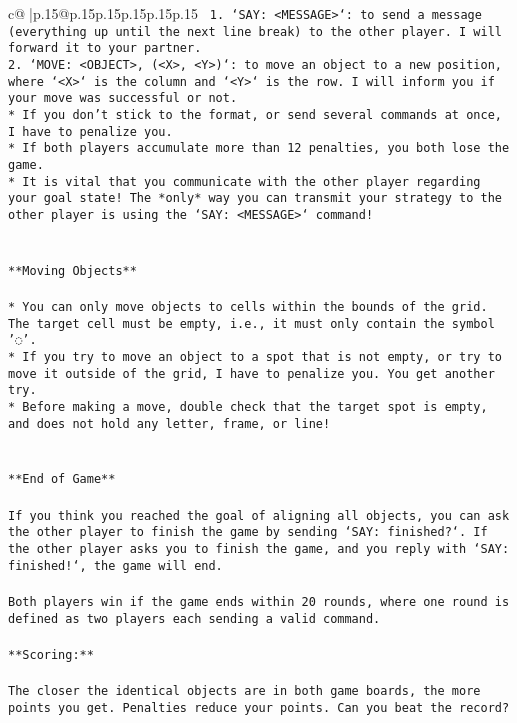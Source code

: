 \documentclass{article}
\begin{document}
{\begin{supertabular}{c@{$\;$}|p{.15\linewidth}@{}p{.15\linewidth}p{.15\linewidth}p{.15\linewidth}p{.15\linewidth}p{.15\linewidth}}
{{{\texttt{ 1. `SAY: <MESSAGE>`: to send a message (everything up until the next line break) to the other player. I will forward it to your partner.} \\
\texttt{2. `MOVE: <OBJECT>, (<X>, <Y>)`: to move an object to a new position, where `<X>` is the column and `<Y>` is the row. I will inform you if your move was successful or not.} \\
\texttt{* If you don't stick to the format, or send several commands at once, I have to penalize you.} \\
\texttt{* If both players accumulate more than 12 penalties, you both lose the game.} \\
\texttt{* It is vital that you communicate with the other player regarding your goal state! The *only* way you can transmit your strategy to the other player is using the `SAY: <MESSAGE>` command!} \\
\\ 
\\ 
\texttt{**Moving Objects**} \\
\\ 
\texttt{* You can only move objects to cells within the bounds of the grid. The target cell must be empty, i.e., it must only contain the symbol '◌'.} \\
\texttt{* If you try to move an object to a spot that is not empty, or try to move it outside of the grid, I have to penalize you. You get another try.} \\
\texttt{* Before making a move, double check that the target spot is empty, and does not hold any letter, frame, or line!} \\
\\ 
\\ 
\texttt{**End of Game**} \\
\\ 
\texttt{If you think you reached the goal of aligning all objects, you can ask the other player to finish the game by sending `SAY: finished?`. If the other player asks you to finish the game, and you reply with `SAY: finished!`, the game will end.} \\
\\ 
\texttt{Both players win if the game ends within 20 rounds, where one round is defined as two players each sending a valid command.} \\
\\ 
\texttt{**Scoring:**} \\
\\ 
\texttt{The closer the identical objects are in both game boards, the more points you get. Penalties reduce your points. Can you beat the record?} \\
}}}
\end{supertabular}}
\end{document}
